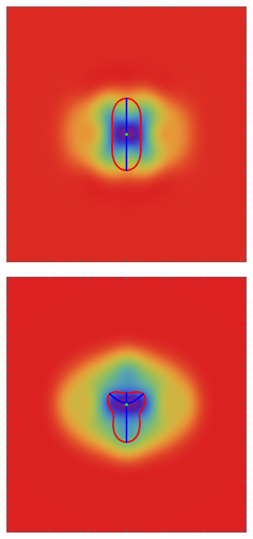 \documentclass[a4paper, 11pt]{article}
\begin{document}
\begin{figure}
\begin{subfigure}[b]{0.24\textwidth}
\end{subfigure}\\ \vspace{0.2\baselineskip}
\begin{subfigure}[b]{0.24\textwidth}
\includegraphics[width=\textwidth]{Cusp_mean_delta_var}
\end{subfigure}
\begin{subfigure}[b]{0.24\textwidth}
\includegraphics[width=\textwidth]{Swallowtail_mean_delta_var}

\end{subfigure}
\end{figure}
\end{document}
